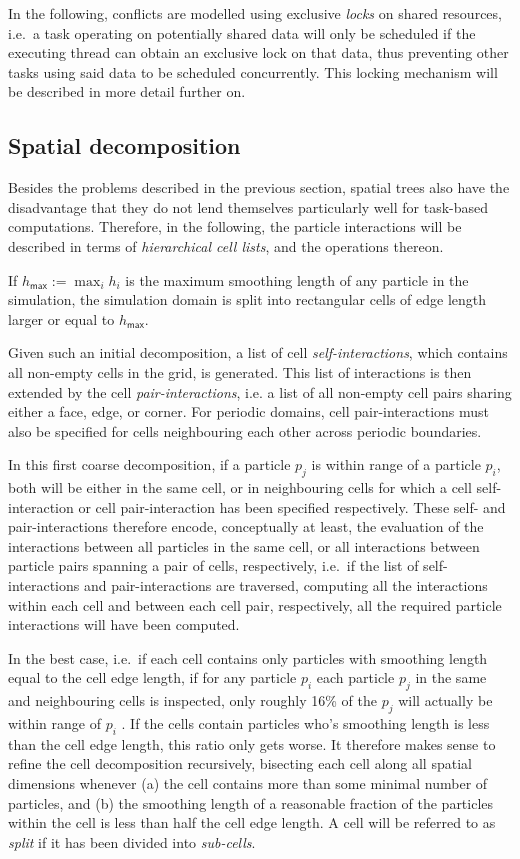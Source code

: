 \documentclass[final]{siamltex}
\begin{document}
In the following, conflicts are modelled using exclusive {\em locks} on shared
resources, i.e.~a task operating on potentially shared data will
only be scheduled if the executing thread can obtain an exclusive
lock on that data,
thus preventing other tasks using said data to be scheduled concurrently.
This locking mechanism will be described in more detail further on.


\subsection{Spatial decomposition}

Besides the problems described in the previous section,
spatial trees also have the disadvantage that they do not
lend themselves particularly well for task-based computations.
Therefore, in the following, the particle interactions will be described in
terms of {\em hierarchical cell lists}, and the operations thereon.

If $h_\mathsf{max} := \max_i  h_i $ is the maximum smoothing
length of any particle in the simulation,  the simulation domain
is split into rectangular cells of edge length
larger or equal to $h_\mathsf{max}$.

Given such an initial decomposition,
a list of cell {\em self-interactions}, which contains all
non-empty cells in the grid, is generated.
This list of interactions is then extended by the cell
{\em pair-interactions}, i.e. a list of all non-empty cell pairs
sharing either a face, edge, or corner.
For periodic domains, cell pair-interactions must also be
specified for cells neighbouring each other across
periodic boundaries.

In this first coarse decomposition, if a particle $p_j$
is within range of a particle $p_i$, both will be either
in the same cell, or in neighbouring cells for which a
cell self-interaction or cell pair-interaction has been
specified respectively.
These self- and pair-interactions therefore encode,
conceptually at least,
the evaluation of the interactions between all particles
in the same cell, or all interactions between particle pairs
spanning a pair of cells, respectively, i.e.~if the list of
self-interactions and pair-interactions are traversed,
computing all the interactions within each cell and between
each cell pair, respectively, all the required particle
interactions will have been computed.

In the best case, i.e.~if each cell contains
only particles with smoothing length equal to the cell
edge length, if for any particle $p_i$ each
particle $p_j$ in the same and neighbouring cells is
inspected, only roughly 16\% of the $p_j$
will actually be within range of $p_i$ \cite{ref:Gonnet2007}.
If the cells contain particles who's smoothing length
is less than the cell edge length, this ratio only
gets worse.
It therefore makes sense to refine the cell decomposition
recursively, bisecting each cell along
all spatial dimensions whenever (a) the cell contains more than
some minimal number of particles, and (b) the smoothing
length of a reasonable fraction of the particles within
the cell is less than half the cell edge length.
A cell will be referred to as {\em split} if it
has been divided into {\em sub-cells}.
\end{document}

